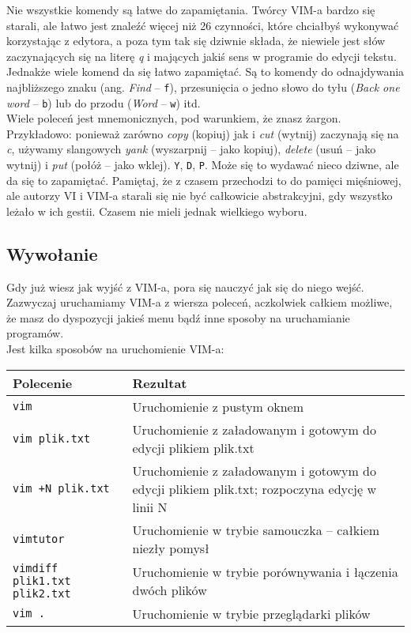 \documentclass[a4paper,12pt]{article}
\begin{document}
Nie wszystkie komendy są łatwe do zapamiętania. Twórcy VIM-a bardzo się starali, ale łatwo jest znaleźć więcej niż 26 czynności, które chciałbyś wykonywać korzystając z edytora, a poza tym tak się dziwnie składa, że niewiele jest słów zaczynających się na literę {\it q} i mających jakiś sens w programie do edycji tekstu. Jednakże wiele komend da się łatwo zapamiętać. Są to komendy do odnajdywania najbliższego znaku (ang. {\it Find} – {\tt f}), przesunięcia o jedno słowo do tyłu ({\it Back one word} – {\tt b}) lub do przodu ({\it Word} – {\tt w}) itd.\\
Wiele poleceń jest mnemonicznych, pod warunkiem, że znasz żargon. Przykładowo: ponieważ zarówno {\it copy} (kopiuj) jak i {\it cut} (wytnij) zaczynają się na {\it c}, używamy slangowych {\it yank} (wyszarpnij – jako kopiuj), {\it delete} (usuń – jako wytnij) i {\it put} (połóż – jako wklej). {\tt Y}, {\tt D}, {\tt P}. Może się to wydawać nieco dziwne, ale da się to zapamiętać. Pamiętaj, że z czasem przechodzi to do pamięci mięśniowej, ale autorzy VI i VIM-a starali się nie być całkowicie abstrakcyjni, gdy wszystko leżało w ich gestii. Czasem nie mieli jednak wielkiego wyboru.
\subsection{Wywołanie}
Gdy już wiesz jak wyjść z VIM-a, pora się nauczyć jak się do niego wejść. Zazwyczaj uruchamiamy VIM-a z wiersza poleceń, aczkolwiek całkiem możliwe, że masz do dyspozycji jakieś menu bądź inne sposoby na uruchamianie programów.\\
Jest kilka sposobów na uruchomienie VIM-a:

\begin{tabular}{ l | p{} }
{\bf Polecenie} & {\bf Rezultat} \\ \hline
{\tt vim} & Uruchomienie z pustym oknem \\
{\tt vim plik.txt} & Uruchomienie z załadowanym i gotowym do edycji plikiem plik.txt \\
{\tt vim +N plik.txt} & Uruchomienie z załadowanym i gotowym do edycji plikiem plik.txt; rozpoczyna edycję w linii N \\
{\tt vimtutor} & Uruchomienie w trybie samouczka -- całkiem niezły pomysł \\
{\tt vimdiff plik1.txt plik2.txt} & Uruchomienie w trybie porównywania i łączenia dwóch plików \\
{\tt vim .} & Uruchomienie w trybie przeglądarki plików \\ \hline
\end{tabular}\\
\end{document}
